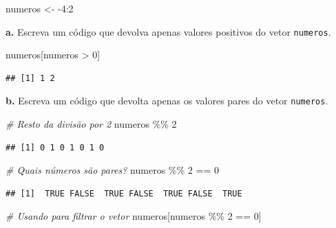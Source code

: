 \documentclass[
]{book}
\newenvironment{Shaded}{\begin{snugshade}}{\end{snugshade}}
\newcommand{\CommentTok}[1]{\textcolor[rgb]{0.56,0.35,0.01}{\textit{#1}}}
\newcommand{\DecValTok}[1]{\textcolor[rgb]{0.00,0.00,0.81}{#1}}
\newcommand{\NormalTok}[1]{#1}
\newcommand{\OtherTok}[1]{\textcolor[rgb]{0.56,0.35,0.01}{#1}}
\newcommand{\SpecialCharTok}[1]{\textcolor[rgb]{0.00,0.00,0.00}{#1}}
\begin{document}
\begin{Shaded}
\begin{Highlighting}[]
\NormalTok{numeros }\OtherTok{\textless{}{-}} \SpecialCharTok{{-}}\DecValTok{4}\SpecialCharTok{:}\DecValTok{2}
\end{Highlighting}
\end{Shaded}

\textbf{a.} Escreva um código que devolva apenas valores positivos do vetor \texttt{numeros}.

\begin{Shaded}
\begin{Highlighting}[]
\NormalTok{numeros[numeros }\SpecialCharTok{\textgreater{}} \DecValTok{0}\NormalTok{]}
\end{Highlighting}
\end{Shaded}

\begin{verbatim}
## [1] 1 2
\end{verbatim}

\textbf{b.} Escreva um código que devolta apenas os valores pares do vetor \texttt{numeros}.

\begin{Shaded}
\begin{Highlighting}[]
\CommentTok{\# Resto da divisão por 2}
\NormalTok{numeros }\SpecialCharTok{\%\%} \DecValTok{2}
\end{Highlighting}
\end{Shaded}

\begin{verbatim}
## [1] 0 1 0 1 0 1 0
\end{verbatim}

\begin{Shaded}
\begin{Highlighting}[]
\CommentTok{\# Quais números são pares?}
\NormalTok{numeros }\SpecialCharTok{\%\%} \DecValTok{2} \SpecialCharTok{==} \DecValTok{0}
\end{Highlighting}
\end{Shaded}

\begin{verbatim}
## [1]  TRUE FALSE  TRUE FALSE  TRUE FALSE  TRUE
\end{verbatim}

\begin{Shaded}
\begin{Highlighting}[]
\CommentTok{\# Usando para filtrar o vetor}
\NormalTok{numeros[numeros }\SpecialCharTok{\%\%} \DecValTok{2} \SpecialCharTok{==} \DecValTok{0}\NormalTok{]}
\end{Highlighting}
\end{Shaded}
\end{document}

